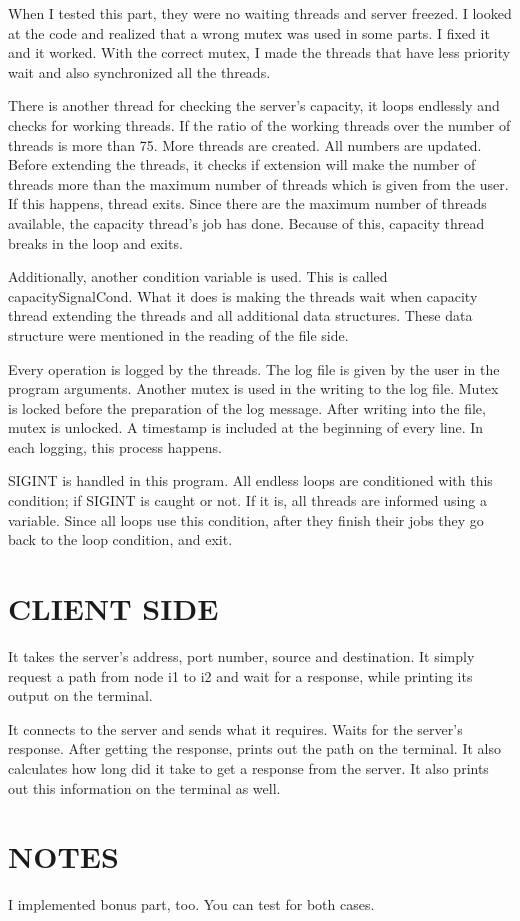 \documentclass{article}
\begin{document}
\bigbreak

When I tested this part, they were no waiting threads and server freezed. I looked at the code and realized
that a wrong mutex was used in some parts. I fixed it and it worked. With the correct mutex, I made the threads that
have less priority wait and also synchronized all the threads.

\bigbreak

There is another thread for checking the server’s capacity, it loops endlessly and checks for working threads. If the 
ratio of the working threads over the number of threads is more than 75. More threads are created. All numbers are 
updated. Before extending the threads, it checks if extension will make the number of threads more than the maximum 
number of threads which is given from the user. If this happens, thread exits. Since there are the maximum number of 
threads available, the capacity thread’s job has done. Because of this, capacity thread breaks in the loop and exits.
\bigbreak

Additionally, another condition variable is used. This is called capacitySignalCond. What it does is making the 
threads wait when capacity thread extending the threads and all additional data structures. These data structure were 
mentioned in the reading of the file side.
\bigbreak

Every operation is logged by the threads. The log file is given by the user in the program arguments.
Another mutex is used in the writing to the log file. Mutex is locked before the preparation of the log message. After 
writing into the file, mutex is unlocked. A timestamp is included at the beginning of every line. In each logging, this 
process happens.

\bigbreak
SIGINT is handled in this program. All endless loops are conditioned with this condition; if SIGINT is caught or not. If
 it is, all threads are informed using a variable. Since all loops use this condition, after they finish their jobs 
 they go back to the loop condition, and exit. 

\bigbreak

\section{CLIENT SIDE}
\bigbreak


It takes the server’s address, port number, source and destination. It simply request a path from node i1 to i2 and wait for a response, while printing its output on the terminal. 
 \bigbreak

It connects to the server and sends what it requires. Waits for the server’s response. After getting the response, prints out the path on the terminal. It also calculates how long did it take to get a response from the server. It also prints out this information on the terminal as well.
\bigbreak

\section{NOTES}
\bigbreak
I implemented bonus part, too. You can test for both cases.

\bigbreak
\end{document}
